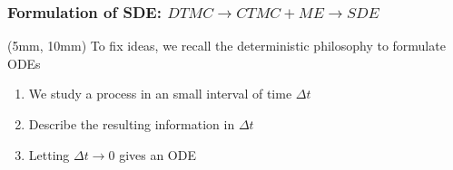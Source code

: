 \begin{frame}
    \frametitle{Formulation of SDE: $DTMC \to CTMC + ME \to SDE$}
    \begin{textblock*}{50mm}(5mm, 10mm)
        To fix ideas, we recall the
        deterministic philosophy to
        formulate ODEs
        \begin{enumerate}[label=(\roman*)]
            \item<2-> 
                We study a process in an small interval of
                time $\Delta t$
            \item<3->
                Describe the resulting information in $\Delta t$
            \item<4->
                Letting $\Delta t \to 0$ gives an ODE
        \end{enumerate}
    \end{textblock*}
\end{frame}

